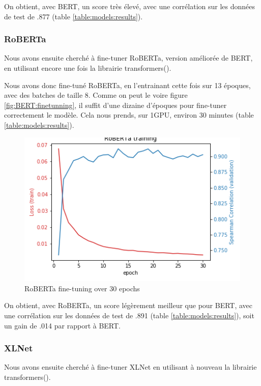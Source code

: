 \documentclass[11pt,a4paper, french]{article}
\begin{document}
On obtient, avec BERT, un score très élevé, avec une corrélation sur les données de test de .877 (table \ref{table:models:results}).

%
\subsubsection{RoBERTa}

Nous avons ensuite cherché à fine-tuner RoBERTa, version améliorée de BERT, en utilisant encore une fois la librairie transformers(\cite{huggingface}).

Nous avons donc fine-tuné RoBERTa, en l'entrainant cette fois sur 13 époques, avec des batches de taille 8. Comme on peut le voire figure \ref{fig:BERT:finetunning}, il suffit d'une dizaine d'époques pour fine-tuner correctement le modèle. Cela nous prends, sur 1GPU, environ 30 minutes (table \ref{table:models:results}).

\begin{figure}
  \includegraphics[width=\linewidth]{resources/roberta-training.png}
  \caption{RoBERTa fine-tuning over 30 epochs}
  \label{fig:RoBERTa:finetunning}
\end{figure}

On obtient, avec RoBERTa, un score légèrement meilleur que pour BERT, avec une corrélation sur les données de test de .891 (table \ref{table:models:results}), soit un gain de .014 par rapport à BERT.

%
\subsubsection{XLNet}

Nous avons ensuite cherché à fine-tuner XLNet en utilisant à nouveau la librairie transformers(\cite{huggingface}).
\end{document}
